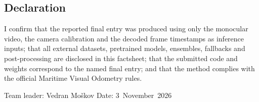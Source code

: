 \documentclass[11pt]{article}
\begin{document}
\subsection*{Declaration}
I confirm that the reported final entry was produced using only the monocular video, the camera calibration and the
decoded frame timestamps as inference inputs; that all external datasets, pretrained models, ensembles, fallbacks
and post-processing are disclosed in this factsheet; that the submitted code and weights correspond to the named final
entry; and that the method complies with the official Maritime Visual Odometry rules.

\noindent Team leader: Vedran Mo\v{s}kov \hfill Date: 3~November~2026

{\small


}
\end{document}
